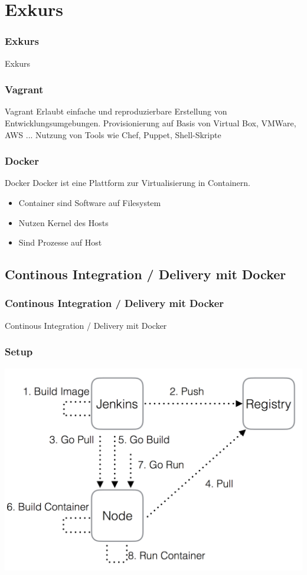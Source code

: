 \section{Exkurs}
\begin{frame}[fragile]
	\frametitle{Exkurs}
\huge Exkurs
\end{frame}

\begin{frame}
\frametitle{Vagrant}
	\begin{block}{Vagrant}
		Erlaubt einfache und reproduzierbare Erstellung von Entwicklungsumgebungen.
    Provisionierung auf Basis von Virtual Box, VMWare, AWS ... Nutzung von Tools
    wie Chef, Puppet, Shell-Skripte
	\end{block}
\end{frame}

\begin{frame}
\frametitle{Docker}
	\begin{block}{Docker}
		Docker ist eine Plattform zur Virtualisierung in Containern.
	\end{block}
  \bigskip
  \begin{itemize}
    \item Container sind Software auf Filesystem
    \item Nutzen Kernel des Hosts
    \item Sind Prozesse auf Host
  \end{itemize}
\end{frame}

\subsection{Continous Integration / Delivery mit Docker}

\begin{frame}
\frametitle{Continous Integration / Delivery mit Docker}
  \huge Continous Integration / Delivery mit Docker
\end{frame}

\begin{frame}
\frametitle{Setup}
  \center
  \includegraphics[width=1\textwidth,
  keepaspectratio=true]{bilder/ci_cd_process.png}
\end{frame}

